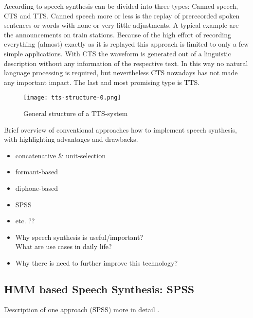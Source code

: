 According to \cite{X} speech synthesis can be divided into three types: Canned speech, \ac{CTS} and \ac{TTS}. Canned speech more or less is the replay of prerecorded spoken sentences or words with none or very little adjustments. A typical example are the announcements on train stations. Because of the high effort of recording everything (almost) exactly as it is replayed this approach is limited to only a few simple applications. With \ac{CTS} the waveform is generated out of a linguistic description without any information of the respective text. In this way no natural language processing is required, but nevertheless \ac{CTS} nowadays has not made any important impact. The last and most promising type is \ac{TTS}.

\begin{figure}[h]
	\texttt{[image: tts-structure-0.png]}
	\caption{General structure of a \ac{TTS}-system \cite{X}}
\end{figure}

Brief overview of conventional approaches how to implement speech synthesis, with highlighting advantages and drawbacks.

\begin{itemize}[leftmargin=10pt]
	\item concatenative \& unit-selection
	\item formant-based
	\item diphone-based
	\item \ac{SPSS}
	\item etc. ??
\end{itemize}

\vspace{1em}

\begin{itemize}[leftmargin=10pt]
	\item Why speech synthesis is useful/important?\\What are use cases in daily life?
	\item Why there is need to further improve this technology?
\end{itemize}

\subsection{HMM based Speech Synthesis: \ac{SPSS}}
\label{subsec:hmmspeech}

Description of one approach (\ac{SPSS}) more in detail \cite{zen:statistical}.

